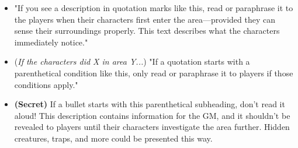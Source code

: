 \documentclass[10pt,a4paper,twoside,bg=print,twocolumn,openany,nodeprecatedcode]{dndbook}
\begin{document}
\begin{itemize}
\item "If you see a description in quotation marks like this, read or paraphrase it to the players when their characters first enter the area—provided they can sense their surroundings properly. This text describes what the characters immediately notice."
\item (\textit{If the characters did X in area Y...}) "If a quotation starts with a parenthetical condition like this, only read or paraphrase it to players if those conditions apply."
\item \textbf{(Secret)} If a bullet starts with this parenthetical subheading, don't read it aloud! This description contains information for the GM, and it shouldn't be revealed to players until their characters investigate the area further. Hidden creatures, traps, and more could be presented this way.
\end{itemize}
\end{document}
